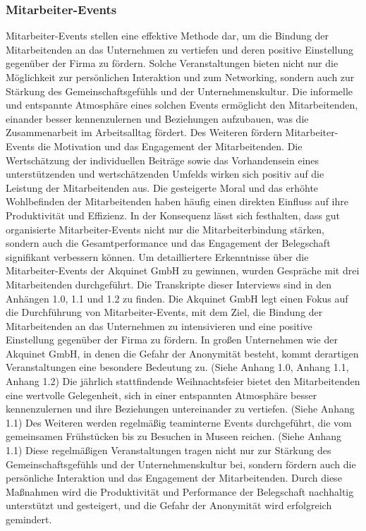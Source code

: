 \subsubsection{Mitarbeiter-Events}\label{sec:mitarbeiterevents}
Mitarbeiter-Events stellen eine effektive Methode dar, um die Bindung der Mitarbeitenden an das Unternehmen zu vertiefen und deren positive Einstellung gegenüber der Firma zu fördern. Solche Veranstaltungen bieten nicht nur die Möglichkeit zur persönlichen Interaktion und zum Networking, sondern auch zur Stärkung des Gemeinschaftsgefühls und der Unternehmenskultur. Die informelle und entspannte Atmosphäre eines solchen Events ermöglicht den Mitarbeitenden, einander besser kennenzulernen und Beziehungen aufzubauen, was die Zusammenarbeit im Arbeitsalltag fördert.\cite{MAEvents}\newline \newline
Des Weiteren fördern Mitarbeiter-Events die Motivation und das Engagement der Mitarbeitenden. Die Wertschätzung der individuellen Beiträge sowie das Vorhandensein eines unterstützenden und wertschätzenden Umfelds wirken sich positiv auf die Leistung der Mitarbeitenden aus. Die gesteigerte Moral und das erhöhte Wohlbefinden der Mitarbeitenden haben häufig einen direkten Einfluss auf ihre Produktivität und Effizienz. In der Konsequenz lässt sich festhalten, dass gut organisierte Mitarbeiter-Events nicht nur die Mitarbeiterbindung stärken, sondern auch die Gesamtperformance und das Engagement der Belegschaft signifikant verbessern können.\cite{MAEvents}\newline \newline
Um detailliertere Erkenntnisse über die Mitarbeiter-Events der Akquinet GmbH zu gewinnen, wurden Gespräche mit drei Mitarbeitenden durchgeführt. Die Transkripte dieser Interviews sind in den Anhängen 1.0, 1.1 und 1.2 zu finden. \newline
Die Akquinet GmbH legt einen Fokus auf die Durchführung von Mitarbeiter-Events, mit dem Ziel, die Bindung der Mitarbeitenden an das Unternehmen zu intensivieren und eine positive Einstellung gegenüber der Firma zu fördern. In großen Unternehmen wie der Akquinet GmbH, in denen die Gefahr der Anonymität besteht, kommt derartigen Veranstaltungen eine besondere Bedeutung zu. (Siehe Anhang 1.0, Anhang 1.1, Anhang 1.2) Die jährlich stattfindende Weihnachtsfeier bietet den Mitarbeitenden eine wertvolle Gelegenheit, sich in einer entspannten Atmosphäre besser kennenzulernen und ihre Beziehungen untereinander zu vertiefen. (Siehe Anhang 1.1)\newline \newline
Des Weiteren werden regelmäßig teaminterne Events durchgeführt, die vom gemeinsamen Frühstücken bis zu Besuchen in Museen reichen. (Siehe Anhang 1.1) Diese regelmäßigen Veranstaltungen tragen nicht nur zur Stärkung des Gemeinschaftsgefühls und der Unternehmenskultur bei, sondern fördern auch die persönliche Interaktion und das Engagement der Mitarbeitenden. Durch diese Maßnahmen wird die Produktivität und Performance der Belegschaft nachhaltig unterstützt und gesteigert, und die Gefahr der Anonymität wird erfolgreich gemindert.

